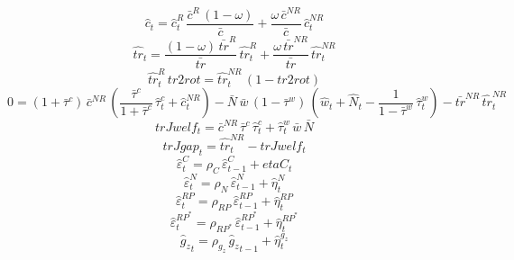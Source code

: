 \begin{dmath}
{\hat{c}_{t}}={\hat{c}^R_{t}}\, \frac{{\bar{c}^R}\, \left(1-{\omega}\right)}{{\bar{c}}}+\frac{{\omega}\, {\bar{c}^{NR}}}{{\bar{c}}}\, {\hat{c}^{NR}_{t}}
\end{dmath}
\begin{dmath}
{\hat{tr}_{t}}=\frac{\left(1-{\omega}\right)\, {\bar{tr}^{R}}}{{\bar{tr}}}\, {\hat{tr}^R_{t}}+\frac{{\omega}\, {\bar{tr}^{NR}}}{{\bar{tr}}}\, {\hat{tr}^{NR}_{t}}
\end{dmath}
\begin{dmath}
{\hat{tr}^R_{t}}\, {tr2rot}={\hat{tr}^{NR}_{t}}\, \left(1-{tr2rot}\right)
\end{dmath}
\begin{dmath}
0=\left(1+{\bar{\tau}^c}\right)\, {\bar{c}^{NR}}\, \left(\frac{{\bar{\tau}^c}}{1+{\bar{\tau}^c}}\, {\hat{\tau}^c_{t}}+{\hat{c}^{NR}_{t}}\right)-{\bar{N}}\, {\bar{w}}\, \left(1-{\bar{\tau}^w}\right)\, \left({\hat{w}_{t}}+{\hat{N}_{t}}-\frac{1}{1-{\bar{\tau}^w}}\, {\hat{\tau}^w_{t}}\right)-{\bar{tr}^{NR}}\, {\hat{tr}^{NR}_{t}}
\end{dmath}
\begin{dmath}
{trJwelf_{t}}={\bar{c}^{NR}}\, {\bar{\tau}^c}\, {\hat{\tau}^c_{t}}+{\hat{\tau}^w_{t}}\, {\bar{w}}\, {\bar{N}}
\end{dmath}
\begin{dmath}
{trJgap_{t}}={\hat{tr}^{NR}_{t}}-{trJwelf_{t}}
\end{dmath}
\begin{dmath}
{\hat{\varepsilon}^C_{t}}={\rho_{C}}\, {\hat{\varepsilon}^C_{t-1}}+{etaC_{t}}
\end{dmath}
\begin{dmath}
{\hat{\varepsilon}^N_{t}}={\rho_{N}}\, {\hat{\varepsilon}^N_{t-1}}+{\hat{\eta}^{N}_{t}}
\end{dmath}
\begin{dmath}
{\hat{\varepsilon}^{RP}_{t}}={\rho_{RP}}\, {\hat{\varepsilon}^{RP}_{t-1}}+{\hat{\eta}^{RP}_{t}}
\end{dmath}
\begin{dmath}
{\hat{\varepsilon}^{RP^*}_{t}}={\rho_{RP^*}}\, {\hat{\varepsilon}^{RP^*}_{t-1}}+{\hat{\eta}^{RP^*}_{t}}
\end{dmath}
\begin{dmath}
{{\hat{g}_z}_{t}}={\rho_{g_z}}\, {{\hat{g}_z}_{t-1}}+{\hat{\eta}^{g_z}_{t}}
\end{dmath}
